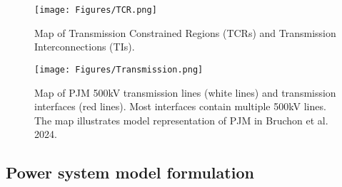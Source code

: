 \documentclass[9pt,twoside,lineno]{pnas-new}
\begin{document}
\begin{figure}[!ht]
    \centering
    \texttt{[image: Figures/TCR.png]}
    \caption{Map of Transmission Constrained Regions (TCRs) and Transmission Interconnections (TIs).}
    \label{fig:TCR}
\end{figure}

\begin{figure}[!ht]
    \centering
    \texttt{[image: Figures/Transmission.png]}
    \caption{Map of PJM 500kV transmission lines (white lines) and transmission interfaces (red lines).  Most interfaces contain multiple 500kV lines. The map illustrates model representation of PJM in Bruchon et al. 2024.}
    \label{fig:trans}
\end{figure}

\subsection{Power system model formulation}
\end{document}
